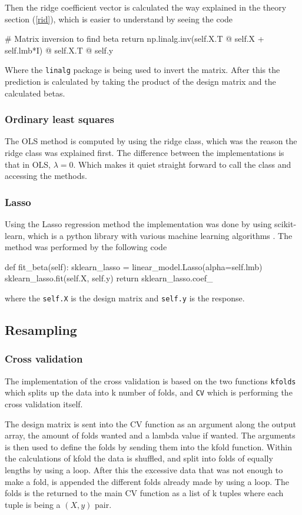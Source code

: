 \documentclass[../main.tex]{subfiles}
\begin{document}
Then the ridge coefficient vector is calculated the way explained in the theory section (\ref{rid}), which is easier to understand by seeing the code
\begin{python}
        # Matrix inversion to find beta
        return np.linalg.inv(self.X.T @ self.X + self.lmb*I) @ self.X.T @ self.y
\end{python}
Where the \verb|linalg| package is being used to invert the matrix. After this the prediction is calculated by taking the product of the design matrix and the calculated betas.

\subsubsection{Ordinary least squares}
The OLS method is computed by using the ridge class, which was the reason the ridge class was explained first. The difference between the implementations is that in OLS, $\lambda=0$. Which makes it quiet straight forward to call the class and accessing the methods.

\subsubsection{Lasso}
Using the Lasso regression method the implementation was done by using scikit-learn, which is a python library with various machine learning algorithms \cite{scikitlearn}. The method was performed by the following code
\begin{python}
    def fit_beta(self):
        sklearn_lasso = linear_model.Lasso(alpha=self.lmb)
        sklearn_lasso.fit(self.X, self.y)
        return sklearn_lasso.coef_
\end{python}
where the \verb|self.X| is the design matrix and \verb|self.y| is the response.

\subsection{Resampling}
\subsubsection{Cross validation}
The implementation of the cross validation is based on the two functions \verb|kfolds| which splits up the data into k number of folds, and \verb|CV| which is performing the cross validation itself.

The design matrix is sent into the CV function as an argument along the output array, the amount of folds wanted and a lambda value if wanted. The arguments is then used to define the folds by sending them into the kfold function. Within the calculations of kfold the data is shuffled, and split into folds of equally lengths by using a loop. After this the excessive data that was not enough to make a fold, is appended the different folds already made by using a loop. The folds is the returned to the main CV function as a list of k tuples where each tuple is being a $(X, y)$ pair.
\end{document}
